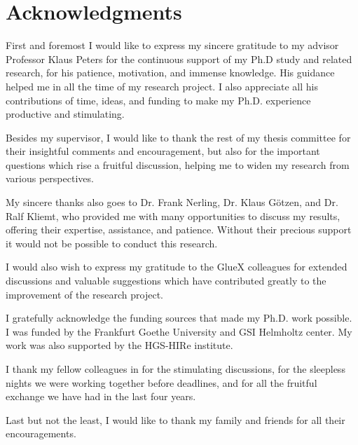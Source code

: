 \section*{Acknowledgments}

First and foremost I would like to express my sincere gratitude to my advisor Professor Klaus Peters for the continuous support of my Ph.D study and related research, for his patience, motivation, and immense knowledge. His guidance helped me in all the time of my research project. I also appreciate all his contributions of time, ideas, and funding to make my Ph.D. experience productive and stimulating.
~\par Besides my supervisor, I would like to thank the rest of my thesis committee for their insightful comments and encouragement, but also for the important questions which rise a fruitful discussion, helping me to widen my research from various perspectives.
~\par My sincere thanks also goes to Dr. Frank Nerling, Dr. Klaus G\"otzen, and Dr. Ralf Kliemt, who provided me with many opportunities to discuss my results, offering their expertise, assistance, and patience. Without their precious support it would not be possible to conduct this research.
~\par I would also wish to express my gratitude to the GlueX colleagues for extended discussions and valuable suggestions which have contributed greatly to the improvement of the research project.
~\par I gratefully acknowledge the funding sources that made my Ph.D. work possible. I was funded by the Frankfurt Goethe University and GSI Helmholtz center. My work was also supported by the HGS-HIRe institute.
~\par I thank my fellow colleagues in for the stimulating discussions, for the sleepless nights we were working together before deadlines, and for all the fruitful exchange we have had in the last four years.
~\par Last but not the least, I would like to thank my family and friends for all their encouragements.

